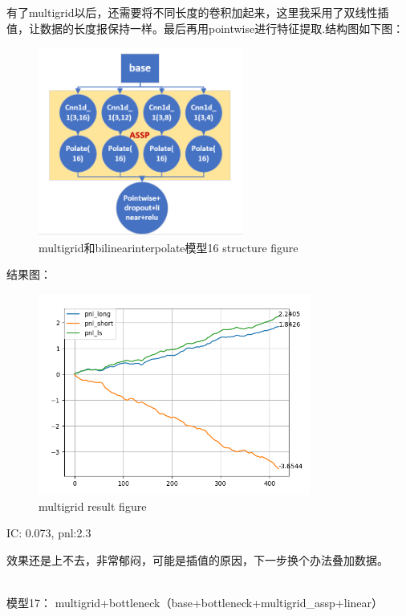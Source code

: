 \documentclass[11pt]{ctexart}
\begin{document}
有了multigrid以后，还需要将不同长度的卷积加起来，这里我采用了双线性插值，让数据的长度报保持一样。最后再用pointwise进行特征提取.结构图如下图：
\begin{figure}[H]
\begin{center}
\includegraphics[width=0.6\textwidth]{str10.PNG}
\end{center}
\caption{multigrid和bilinearinterpolate模型16 structure figure}
\label{FIG.10}
\end{figure}
结果图：
\begin{figure}[H]
\begin{center}
\includegraphics[width=0.8\textwidth]{plt1.PNG}
\end{center}
\caption{multigrid result figure}
\label{FIG.11}
\end{figure}

{\kaishu \small IC: 0.073, pnl:2.3}

效果还是上不去，非常郁闷，可能是插值的原因，下一步换个办法叠加数据。

~\\
模型17： multigrid+bottleneck（base+bottleneck+multigrid\_assp+linear）
\end{document}
